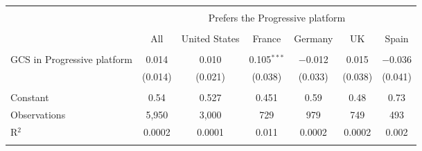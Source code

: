 
\begin{tabular}{@{\extracolsep{5pt}}lcccccc} 
\\[-1.8ex]\hline 
\hline \\[-1.8ex] 
 & \multicolumn{6}{c}{Prefers the Progressive platform} \\ 
\cline{2-7} 
\\[-1.8ex] & All & United States & France & Germany & UK & Spain \\ 
\hline \\[-1.8ex] 
 GCS in Progressive platform & 0.014 & 0.010 & 0.105$^{***}$ & $-$0.012 & 0.015 & $-$0.036 \\ 
  & (0.014) & (0.021) & (0.038) & (0.033) & (0.038) & (0.041) \\ 
 \hline \\[-1.8ex] 
Constant & 0.54 & 0.527 & 0.451 & 0.59 & 0.48 & 0.73 \\ 
Observations & 5,950 & 3,000 & 729 & 979 & 749 & 493 \\ 
R$^{2}$ & 0.0002 & 0.0001 & 0.011 & 0.0002 & 0.0002 & 0.002 \\ 
\hline 
\hline \\[-1.8ex] 
\end{tabular} 
